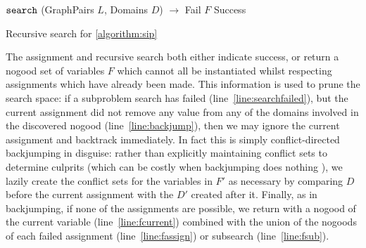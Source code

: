 \documentclass{llncs}
\newcommand{\lineref}[1]{line~\ref{#1}}
\begin{document}
\begin{algorithm}[t]
\DontPrintSemicolon
{}
\nl $\FuncSty{search}$ (GraphPairs $L$, Domains $D$) $\rightarrow$ Fail $F$  Success \;
\nl {}
\caption{Recursive search for \cref{algorithm:sip}}
\label{algorithm:search}
\end{algorithm}

The assignment and recursive search both either indicate success, or return a nogood set of
variables $F$ which cannot all be instantiated whilst respecting assignments which have already been
made. This information is used to prune the search space: if a subproblem search has failed
(\lineref{line:searchfailed}), but the current assignment did not remove any value from any of the
domains involved in the discovered nogood (\lineref{line:backjump}), then we may ignore the current
assignment and backtrack immediately.  In fact this is simply conflict-directed backjumping
\cite{Prosser:1993a} in disguise: rather than explicitly maintaining conflict sets to determine
culprits (which can be costly when backjumping does nothing \cite{Bessiere:1996,Gent:2010}), we
lazily create the conflict sets for the variables in $F'$ as necessary by comparing $D$ before the
current assignment with the $D'$ created after it. Finally, as in backjumping, if none of the
assignments are possible, we return with a nogood of the current variable (\lineref{line:fcurrent})
combined with the union of the nogoods of each failed assignment (\lineref{line:fassign}) or
subsearch (\lineref{line:fsub}).
\end{document}
